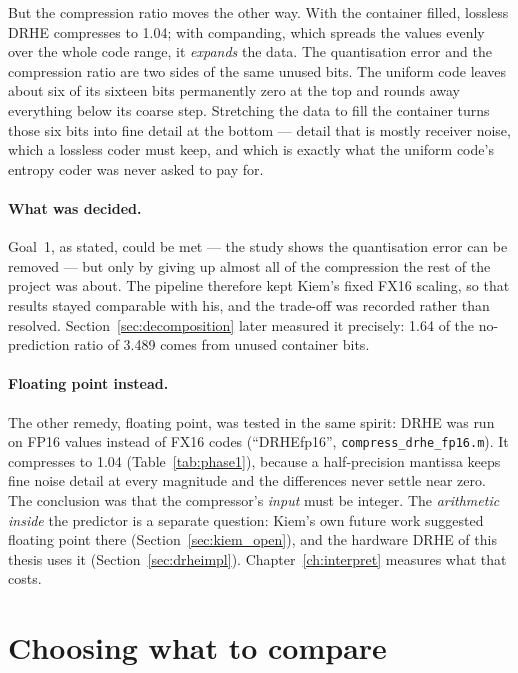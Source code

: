 But the compression ratio moves the other way. With the container filled,
lossless DRHE compresses to 1.04; with companding, which spreads the values
evenly over the whole code range, it \emph{expands} the data. The quantisation
error and the compression ratio are two sides of the same unused bits. The
uniform code leaves about six of its sixteen bits permanently zero at the top
and rounds away everything below its coarse step. Stretching the data to fill
the container turns those six bits into fine detail at the bottom --- detail
that is mostly receiver noise, which a lossless coder must keep, and which is
exactly what the uniform code's entropy coder was never asked to pay for.

\paragraph{What was decided.} Goal~1, as stated, could be met --- the study
shows the quantisation error can be removed --- but only by giving up almost all
of the compression the rest of the project was about. The pipeline therefore
kept Kiem's fixed FX16 scaling, so that results stayed comparable with his, and
the trade-off was recorded rather than resolved. Section~\ref{sec:decomposition}
later measured it precisely: \num{1.64} of the no-prediction ratio of
\num{3.489} comes from unused container bits.

\paragraph{Floating point instead.} The other remedy, floating point, was
tested in the same spirit: DRHE was run on FP16 values instead of FX16 codes
(``DRHEfp16'', \texttt{compress\_drhe\_fp16.m}). It compresses to 1.04
(Table~\ref{tab:phase1}), because a half-precision mantissa keeps fine noise
detail at every magnitude and the differences never settle near zero. The
conclusion was that the compressor's \emph{input} must be integer. The
\emph{arithmetic inside} the predictor is a separate question: Kiem's own future
work suggested floating point there (Section~\ref{sec:kiem_open}), and the
hardware DRHE of this thesis uses it (Section~\ref{sec:drheimpl}).
Chapter~\ref{ch:interpret} measures what that costs.

\section{Choosing what to compare}
\label{sec:jr_choose}

